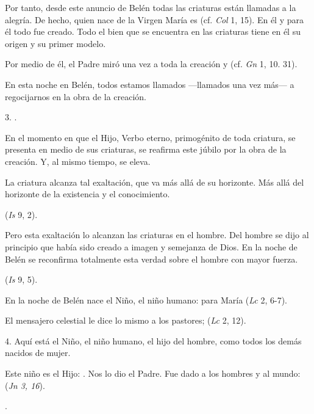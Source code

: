 \begin{body}
\begin{body}
		Por tanto, desde este anuncio de Belén todas las criaturas están llamadas a la alegría. De hecho, quien nace de la Virgen María es  (cf. \emph{Col} 1, 15). En él y para él todo fue creado. Todo el bien que se encuentra en las criaturas tiene en él su origen y su primer modelo.

		Por medio de él, el Padre miró una vez a toda la creación y  (cf. \emph{Gn} 1, 10. 31).

		En esta noche en Belén, todos estamos llamados ---llamados una vez más--- a regocijarnos en la obra de la creación.

		3. .

		En el momento en que el Hijo, Verbo eterno, primogénito de toda criatura, se presenta en medio de sus criaturas, se reafirma este júbilo por la obra de la creación. Y, al mismo tiempo, se eleva.

		La criatura alcanza tal exaltación, que va más allá de su horizonte. Más allá del horizonte de la existencia y el conocimiento.

		 (\emph{Is} 9, 2).

		Pero esta exaltación lo alcanzan las criaturas en el hombre. Del hombre se dijo al principio que había sido creado a imagen y semejanza de Dios. En la noche de Belén se reconfirma totalmente esta verdad sobre el hombre con mayor fuerza.

		 (\emph{Is} 9, 5).

		En la noche de Belén nace el Niño, el niño humano: para María  (\emph{Lc} 2, 6-7).

		El mensajero celestial le dice lo mismo a los pastores;  (\emph{Lc} 2, 12).

		4. Aquí está el Niño, el niño humano, el hijo del hombre, como todos los demás nacidos de mujer.

		Este niño es el Hijo: . Nos lo dio el Padre. Fue dado a los hombres y al mundo:  (\emph{Jn 3, 16}).

		.


\end{body}
\end{body}
